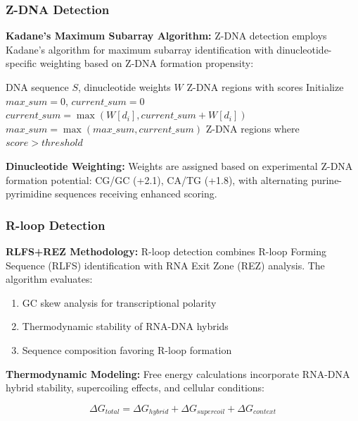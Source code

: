 \documentclass[twocolumn,letterpaper]{article}
\begin{document}
\subsubsection{Z-DNA Detection}

\textbf{Kadane's Maximum Subarray Algorithm:} Z-DNA detection employs Kadane's algorithm for maximum subarray identification with dinucleotide-specific weighting based on Z-DNA formation propensity\cite{Ho1986}:

\begin{algorithm}
\caption{Enhanced Z-DNA Detection}
\begin{algorithmic}
\REQUIRE DNA sequence $S$, dinucleotide weights $W$
\ENSURE Z-DNA regions with scores
\STATE Initialize $max\_sum = 0$, $current\_sum = 0$
    \STATE $current\_sum = \max(W[d_i], current\_sum + W[d_i])$
    \STATE $max\_sum = \max(max\_sum, current\_sum)$
\ENDFOR
\RETURN Z-DNA regions where $score > threshold$
\end{algorithmic}
\end{algorithm}

\textbf{Dinucleotide Weighting:} Weights are assigned based on experimental Z-DNA formation potential: CG/GC (+2.1), CA/TG (+1.8), with alternating purine-pyrimidine sequences receiving enhanced scoring.

\subsubsection{R-loop Detection}

\textbf{RLFS+REZ Methodology:} R-loop detection combines R-loop Forming Sequence (RLFS) identification with RNA Exit Zone (REZ) analysis\cite{Ginno2012}. The algorithm evaluates:

\begin{enumerate}
    \item GC skew analysis for transcriptional polarity
    \item Thermodynamic stability of RNA-DNA hybrids
    \item Sequence composition favoring R-loop formation
\end{enumerate}

\textbf{Thermodynamic Modeling:} Free energy calculations incorporate RNA-DNA hybrid stability, supercoiling effects, and cellular conditions:

\begin{equation}
\Delta G_{total} = \Delta G_{hybrid} + \Delta G_{supercoil} + \Delta G_{context}
\end{equation}
\end{document}
